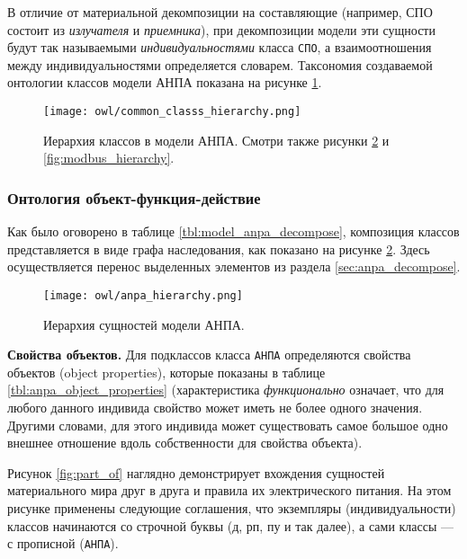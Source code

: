 В отличие от материальной декомпозиции на составляющие (например, СПО состоит из \textit{излучателя} и \textit{приемника}),
при декомпозиции модели эти сущности будут так называемыми \textit{индивидуальностями} класса \texttt{СПО},
а взаимоотношения между индивидуальностями определяется словарем.
Таксономия создаваемой онтологии классов модели АНПА показана на рисунке \ref{fig:common_classs_hierarchy}.

\begin{center}
    \begin{figure}[ht!]
        \texttt{[image: owl/common\_classs\_hierarchy.png]}
        \caption{Иерархия классов в модели АНПА.
            Смотри также рисунки \ref{fig:anpa_hierarchy} и \ref{fig:modbus_hierarchy}.}\label{fig:common_classs_hierarchy}
    \end{figure}
\end{center}



\subsubsection{Онтология объект-функция-действие}
Как было оговорено в таблице \ref{tbl:model_anpa_decompose}, композиция классов представляется в виде графа наследования,
как показано на рисунке \ref{fig:anpa_hierarchy}. Здесь осуществляется перенос выделенных элементов из раздела \ref{sec:anpa_decompose}.

\begin{center}
    \begin{figure}[ht!]
        \texttt{[image: owl/anpa\_hierarchy.png]}
        \caption{Иерархия сущностей модели АНПА.}\label{fig:anpa_hierarchy}
    \end{figure}
\end{center}


\textbf{Свойства объектов.}
Для подклассов класса \texttt{АНПА} определяются свойства объектов (object properties), которые показаны в таблице \ref{tbl:anpa_object_properties}
(характеристика \textit{функционально} означает, что для любого данного индивида свойство может иметь не более одного значения. 
Другими словами, для этого индивида может существовать самое большое одно внешнее отношение вдоль собственности для свойства объекта).
%

Рисунок \ref{fig:part_of} наглядно демонстрирует вхождения сущностей материального мира друг в друга и правила их электрического питания.
На этом рисунке применены следующие соглашения, что экземпляры (индивидуальности) классов начинаются со строчной буквы (д, рп, пу и так далее),
а сами классы --- с прописной (\texttt{АНПА}).

